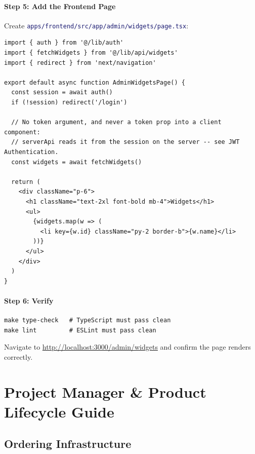 \documentclass[12pt,a4paper,twoside]{report}
\newcommand{\file}[1]{\texttt{\textcolor{MidnightBlue}{#1}}}
\begin{document}
\subsection{Step 5: Add the Frontend Page}

Create \file{apps/frontend/src/app/admin/widgets/page.tsx}:

\begin{lstlisting}[style=typescript]
import { auth } from '@/lib/auth'
import { fetchWidgets } from '@/lib/api/widgets'
import { redirect } from 'next/navigation'

export default async function AdminWidgetsPage() {
  const session = await auth()
  if (!session) redirect('/login')

  // No token argument, and never a token prop into a client component:
  // serverApi reads it from the session on the server -- see JWT Authentication.
  const widgets = await fetchWidgets()

  return (
    <div className="p-6">
      <h1 className="text-2xl font-bold mb-4">Widgets</h1>
      <ul>
        {widgets.map(w => (
          <li key={w.id} className="py-2 border-b">{w.name}</li>
        ))}
      </ul>
    </div>
  )
}
\end{lstlisting}

\subsection{Step 6: Verify}

\begin{lstlisting}[style=bash]
make type-check   # TypeScript must pass clean
make lint         # ESLint must pass clean
\end{lstlisting}

Navigate to \url{http://localhost:3000/admin/widgets} and confirm the
page renders correctly.

\part{Project Manager \& Product Lifecycle Guide}
\label{part:pm}

\chapter{Ordering Infrastructure}
\label{ch:ordering}
\end{document}
